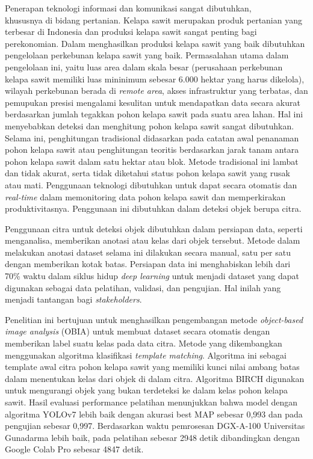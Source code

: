 \begin{singlespace}
Penerapan teknologi informasi dan komunikasi sangat dibutuhkan,\\khususnya di bidang pertanian. Kelapa sawit merupakan produk pertanian yang terbesar di Indonesia dan produksi kelapa sawit sangat penting bagi perekonomian. Dalam menghasilkan produksi kelapa sawit yang baik dibutuhkan pengelolaan perkebunan kelapa sawit yang baik. Permasalahan utama dalam pengelolaan ini, yaitu luas area dalam skala besar (perusahaan perkebunan kelapa sawit memiliki luas mininimum sebesar 6.000 hektar yang harus dikelola), wilayah perkebunan berada di \textit{remote area}, akses infrastruktur yang terbatas, dan pemupukan presisi mengalami kesulitan untuk mendapatkan data secara akurat berdasarkan jumlah tegakkan pohon kelapa sawit pada suatu area lahan. Hal ini menyebabkan deteksi dan menghitung pohon kelapa sawit sangat dibutuhkan. Selama ini, penghitungan tradisional didasarkan pada catatan awal penanaman pohon kelapa sawit atau penghitungan teoritis berdasarkan jarak tanam antara pohon kelapa sawit dalam satu hektar atau blok. Metode tradisional ini lambat dan tidak akurat, serta tidak diketahui status pohon kelapa sawit yang rusak atau mati. Penggunaan teknologi dibutuhkan untuk dapat secara otomatis dan \textit{real-time} dalam memonitoring data pohon kelapa sawit dan memperkirakan produktivitasnya. Penggunaan ini dibutuhkan dalam deteksi objek berupa citra.

Penggunaan citra untuk deteksi objek dibutuhkan dalam persiapan data, seperti menganalisa, memberikan anotasi atau kelas dari objek tersebut. Metode dalam melakukan anotasi dataset selama ini dilakukan secara manual, satu per satu dengan memberikan kotak batas. Persiapan data ini menghabiskan lebih dari 70\% waktu dalam siklus hidup \textit{deep learning} untuk menjadi dataset yang dapat digunakan sebagai data pelatihan, validasi, dan pengujian. Hal inilah yang menjadi tantangan bagi \textit{stakeholders}. 

Penelitian ini bertujuan untuk menghasilkan pengembangan metode \textit{object-based image analysis} (OBIA) untuk membuat dataset secara otomatis dengan memberikan label suatu kelas pada data citra. Metode yang dikembangkan menggunakan algoritma klasifikasi \textit{template matching}. Algoritma ini sebagai template awal citra pohon kelapa sawit yang memiliki kunci nilai ambang batas dalam menentukan kelas dari objek di dalam citra. Algoritma BIRCH digunakan untuk mengurangi objek yang bukan terdeteksi ke dalam kelas pohon kelapa sawit. Hasil evaluasi performance pelatihan menunjukkan bahwa model dengan algoritma YOLOv7 lebih baik dengan akurasi best MAP sebesar 0,993 dan pada pengujian sebesar 0,997. Berdasarkan waktu pemrosesan DGX-A-100 Universitas Gunadarma lebih baik, pada pelatihan sebesar 2948 detik dibandingkan dengan Google Colab Pro sebesar 4847 detik.


\end{singlespace}
